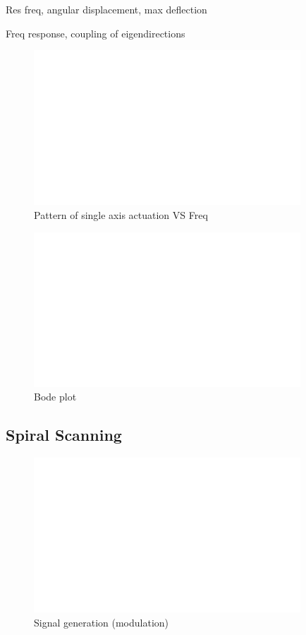 Res freq, angular displacement, max deflection

Freq response, coupling of eigendirections

\begin{figure}[h!]\centering \includegraphics[width=10cm,draft]{figures/foo.png}
      \caption{Pattern of single axis actuation VS Freq}
\end{figure}


\begin{figure}[h!]\centering \includegraphics[width=10cm,draft]{figures/foo.png}
      \caption{Bode plot}
\end{figure}



\clearpage
\subsection{Spiral Scanning}

\begin{figure}[h!]\centering \includegraphics[width=10cm,draft]{figures/foo.png}
      \caption{Signal generation (modulation)}
\end{figure}


